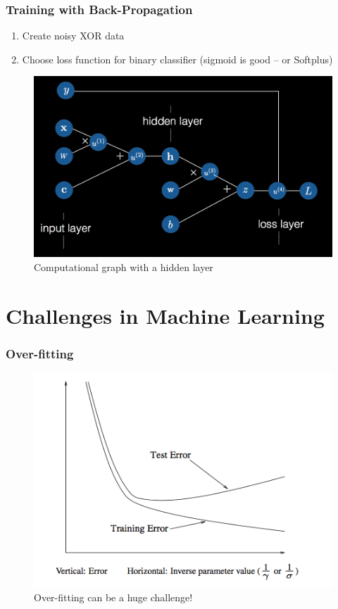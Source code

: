 \documentclass[10pt]{beamer}
\begin{document}
\begin{frame}
	\frametitle{Training with Back-Propagation}
	\begin{enumerate}
		\item Create noisy XOR data
		\item Choose loss function for binary classifier (sigmoid is good -- or Softplus)
	\end{enumerate}
	\begin{figure}
		\includegraphics[width=\textwidth,height=0.55\textheight,keepaspectratio=true]{cgraph_hidden.png}
		\caption{Computational graph with a hidden layer}
	\end{figure}
\end{frame}


\section{Challenges in Machine Learning}

\begin{frame}
	\frametitle{Over-fitting}
	\begin{figure}
		\includegraphics[width=\textwidth,height=0.85\textheight,keepaspectratio=true]{overfit_graph.png}
		\caption{Over-fitting can be a huge challenge!}
	\end{figure}
\end{frame}
\end{document}
